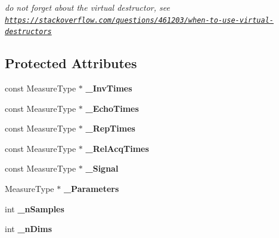 \begin{DoxyCompactItemize}
\begin{DoxyCompactList}\small\item\em do not forget about the virtual destructor, see \href{https://stackoverflow.com/questions/461203/when-to-use-virtual-destructors}{\tt https\-://stackoverflow.\-com/questions/461203/when-\/to-\/use-\/virtual-\/destructors} \end{DoxyCompactList}\end{DoxyCompactItemize}
\subsection*{Protected Attributes}
\begin{DoxyCompactItemize}
\item 
\hypertarget{class_ox_1_1_functions_t1_a4e92c3f06b7ef0327d6625a662db4d1c}{const Measure\-Type $\ast$ {\bfseries \-\_\-\-Inv\-Times}}\label{class_ox_1_1_functions_t1_a4e92c3f06b7ef0327d6625a662db4d1c}

\item 
\hypertarget{class_ox_1_1_functions_t1_adaf6b5335e0014ad37c007a24f150343}{const Measure\-Type $\ast$ {\bfseries \-\_\-\-Echo\-Times}}\label{class_ox_1_1_functions_t1_adaf6b5335e0014ad37c007a24f150343}

\item 
\hypertarget{class_ox_1_1_functions_t1_a719873f2f02b6dcf0ae100f9c9a6884f}{const Measure\-Type $\ast$ {\bfseries \-\_\-\-Rep\-Times}}\label{class_ox_1_1_functions_t1_a719873f2f02b6dcf0ae100f9c9a6884f}

\item 
\hypertarget{class_ox_1_1_functions_t1_abfbc38cf7ea0bbc1b52f48a75f281246}{const Measure\-Type $\ast$ {\bfseries \-\_\-\-Rel\-Acq\-Times}}\label{class_ox_1_1_functions_t1_abfbc38cf7ea0bbc1b52f48a75f281246}

\item 
\hypertarget{class_ox_1_1_functions_t1_a8f87abd26c39fddd3e2b0085e97c6571}{const Measure\-Type $\ast$ {\bfseries \-\_\-\-Signal}}\label{class_ox_1_1_functions_t1_a8f87abd26c39fddd3e2b0085e97c6571}

\item 
\hypertarget{class_ox_1_1_functions_t1_a6958f5841b785da10dcd1c1c777799c7}{Measure\-Type $\ast$ {\bfseries \-\_\-\-Parameters}}\label{class_ox_1_1_functions_t1_a6958f5841b785da10dcd1c1c777799c7}

\item 
\hypertarget{class_ox_1_1_functions_t1_a32038248ea53c223d9d99cd9cee36378}{int {\bfseries \-\_\-n\-Samples}}\label{class_ox_1_1_functions_t1_a32038248ea53c223d9d99cd9cee36378}

\item 
\hypertarget{class_ox_1_1_functions_t1_a4d42b89cb62d20c80e3210b17a692ed1}{int {\bfseries \-\_\-n\-Dims}}\label{class_ox_1_1_functions_t1_a4d42b89cb62d20c80e3210b17a692ed1}

\end{DoxyCompactItemize}


